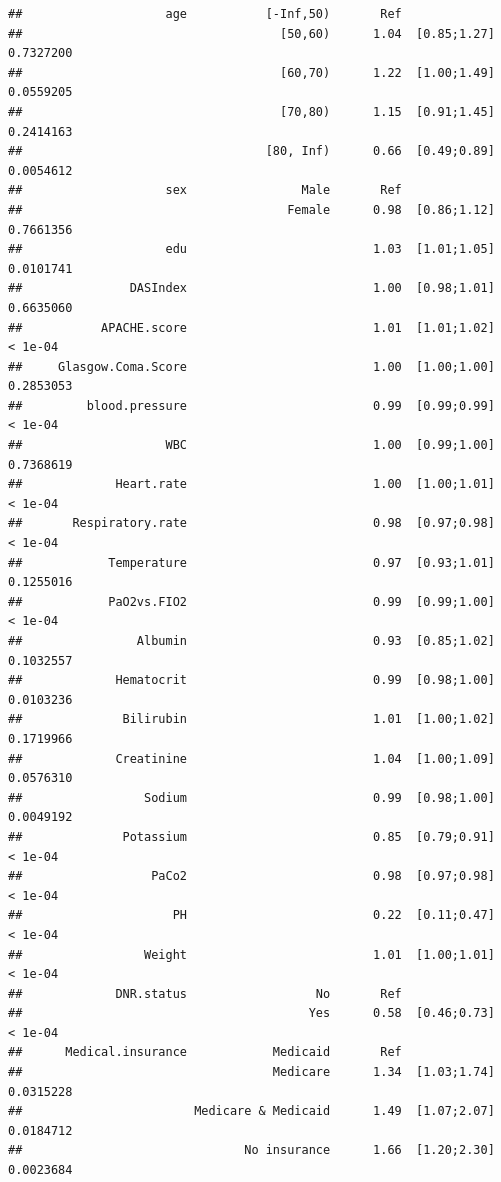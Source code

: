 \documentclass[
]{book}
\begin{document}
\begin{verbatim}
##                    age           [-Inf,50)       Ref                          
##                                    [50,60)      1.04  [0.85;1.27]   0.7327200 
##                                    [60,70)      1.22  [1.00;1.49]   0.0559205 
##                                    [70,80)      1.15  [0.91;1.45]   0.2414163 
##                                  [80, Inf)      0.66  [0.49;0.89]   0.0054612 
##                    sex                Male       Ref                          
##                                     Female      0.98  [0.86;1.12]   0.7661356 
##                    edu                          1.03  [1.01;1.05]   0.0101741 
##               DASIndex                          1.00  [0.98;1.01]   0.6635060 
##           APACHE.score                          1.01  [1.01;1.02]     < 1e-04 
##     Glasgow.Coma.Score                          1.00  [1.00;1.00]   0.2853053 
##         blood.pressure                          0.99  [0.99;0.99]     < 1e-04 
##                    WBC                          1.00  [0.99;1.00]   0.7368619 
##             Heart.rate                          1.00  [1.00;1.01]     < 1e-04 
##       Respiratory.rate                          0.98  [0.97;0.98]     < 1e-04 
##            Temperature                          0.97  [0.93;1.01]   0.1255016 
##            PaO2vs.FIO2                          0.99  [0.99;1.00]     < 1e-04 
##                Albumin                          0.93  [0.85;1.02]   0.1032557 
##             Hematocrit                          0.99  [0.98;1.00]   0.0103236 
##              Bilirubin                          1.01  [1.00;1.02]   0.1719966 
##             Creatinine                          1.04  [1.00;1.09]   0.0576310 
##                 Sodium                          0.99  [0.98;1.00]   0.0049192 
##              Potassium                          0.85  [0.79;0.91]     < 1e-04 
##                  PaCo2                          0.98  [0.97;0.98]     < 1e-04 
##                     PH                          0.22  [0.11;0.47]     < 1e-04 
##                 Weight                          1.01  [1.00;1.01]     < 1e-04 
##             DNR.status                  No       Ref                          
##                                        Yes      0.58  [0.46;0.73]     < 1e-04 
##      Medical.insurance            Medicaid       Ref                          
##                                   Medicare      1.34  [1.03;1.74]   0.0315228 
##                        Medicare & Medicaid      1.49  [1.07;2.07]   0.0184712 
##                               No insurance      1.66  [1.20;2.30]   0.0023684 

\end{verbatim}
\end{document}
